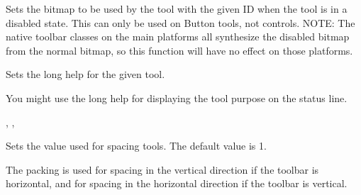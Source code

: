 
Sets the bitmap to be used by the tool with the given ID when the tool
is in a disabled state.  This can only be used on Button tools, not
controls.  NOTE: The native toolbar classes on the main platforms all
synthesize the disabled bitmap from the normal bitmap, so this
function will have no effect on those platforms.


\label{wxtoolbarsettoollonghelp}


Sets the long help for the given tool.





You might use the long help for displaying the tool purpose on the status line.


,\rtfsp
{},\rtfsp


\label{wxtoolbarsettoolpacking}


Sets the value used for spacing tools. The default value is 1.




The packing is used for spacing in the vertical direction if the toolbar is horizontal,
and for spacing in the horizontal direction if the toolbar is vertical.




\label{wxtoolbarsettoolshorthelp}


